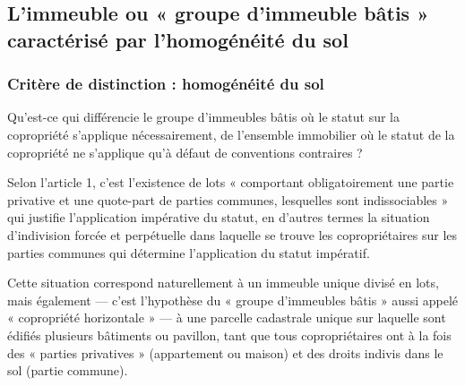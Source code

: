 	\subsection{L’immeuble ou « groupe d’immeuble bâtis » caractérisé par l’homogénéité du sol}
	
		\subsubsection{Critère de distinction : homogénéité du sol}
		
			Qu'est-ce qui différencie le groupe d'immeubles bâtis où le statut sur la copropriété s'applique
			nécessairement, de l'ensemble immobilier où le statut de la copropriété ne s'applique qu'à défaut de
			conventions contraires ?
			
			Selon l’article 1, c’est l’existence de lots « comportant obligatoirement une partie privative et une
			quote-part de parties communes, lesquelles sont indissociables » qui justifie l’application
			impérative du statut, en d’autres termes la situation d’indivision forcée et perpétuelle dans
			laquelle se trouve les copropriétaires sur les parties communes qui détermine l’application du
			statut impératif.
			
			Cette situation correspond naturellement à un immeuble unique divisé en lots, mais également –-- c’est
			l’hypothèse du « groupe d’immeubles bâtis » aussi appelé « copropriété horizontale » --- à une parcelle
			cadastrale unique sur laquelle sont édifiés plusieurs bâtiments ou pavillon, tant que tous copropriétaires
			ont à la fois des « parties privatives » (appartement ou maison) et des droits indivis dans le sol (partie
			commune).
			
